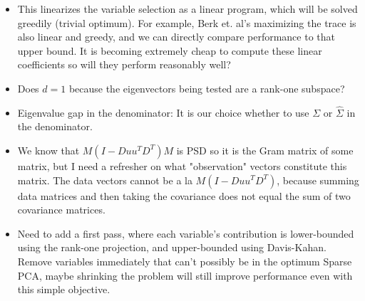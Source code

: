 \documentclass{article}
\begin{document}
\begin{itemize}
    \item This linearizes the variable selection as a linear program, which will be solved greedily (trivial optimum). For example, Berk et. al's maximizing the trace is also linear and greedy, and we can directly compare performance to that upper bound. It is becoming extremely cheap to compute these linear coefficients so will they perform reasonably well?
    \item Does $d=1$ because the eigenvectors being tested are a rank-one subspace?
    \item Eigenvalue gap in the denominator: It is our choice whether to use $\Sigma$ or $\hat{\Sigma}$ in the denominator.
    \item We know that $M(I-Duu^TD^T)M$ is PSD so it is the Gram matrix of some matrix, but I need a refresher on what "observation" vectors constitute this matrix. The data vectors cannot be a la $M(I-Duu^TD^T)$, because summing data matrices and then taking the covariance does not equal the sum of two covariance matrices.
    \item Need to add a first pass, where each variable's contribution is lower-bounded using the rank-one projection, and upper-bounded using Davis-Kahan. Remove variables immediately that can't possibly be in the optimum Sparse PCA, maybe shrinking the problem will still improve performance even with this simple objective.
\end{itemize}
\end{document}

